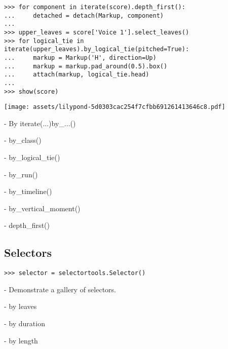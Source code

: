 \begin{abjadbookoutput}
\begin{singlespacing}
\vspace{-0.5\baselineskip}
\begin{lstlisting}
>>> for component in iterate(score).depth_first():
...     detached = detach(Markup, component)
...
>>> upper_leaves = score['Voice 1'].select_leaves()
>>> for logical_tie in iterate(upper_leaves).by_logical_tie(pitched=True):
...     markup = Markup('H', direction=Up)
...     markup = markup.pad_around(0.5).box()
...     attach(markup, logical_tie.head)
...
>>> show(score)
\end{lstlisting}
\noindent\texttt{[image: assets/lilypond-5d0303cac254f7cfbb691261413646c8.pdf]}
\end{singlespacing}
\end{abjadbookoutput}

-   By iterate(...)by\_...()

    -   by\_class()

    -   by\_logical\_tie()

    -   by\_run()

    -   by\_timeline()

    -   by\_vertical\_moment()

    -   depth\_first()

\subsection{Selectors}

\begin{comment}
<abjad>
selector = selectortools.Selector()
</abjad>
\end{comment}

\begin{abjadbookoutput}
\begin{singlespacing}
\vspace{-0.5\baselineskip}
\begin{lstlisting}
>>> selector = selectortools.Selector()
\end{lstlisting}
\end{singlespacing}
\end{abjadbookoutput}

-   Demonstrate a gallery of selectors.

    -   by leaves

    -   by duration

    -   by length

